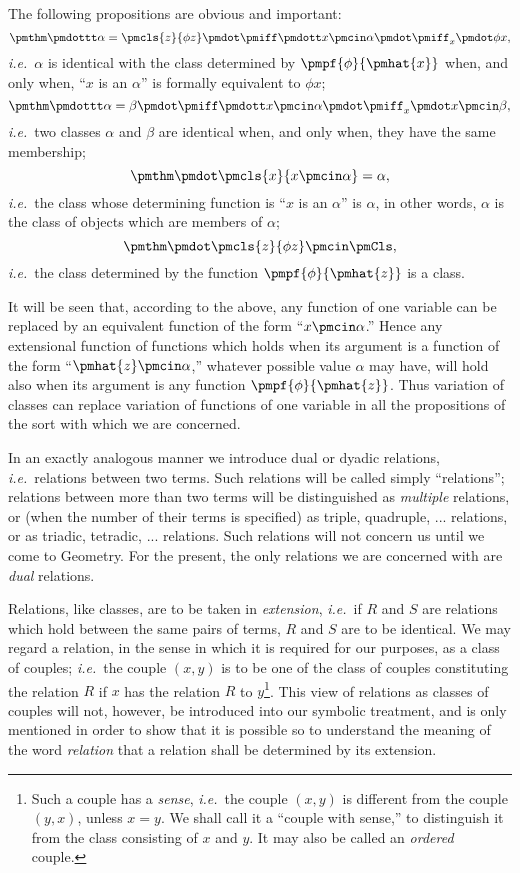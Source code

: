 \documentclass[letterpaper,12pt,openany,leqno]{book}
\newcommand{\pagefirst}[1]{\marginnote[\boxed{\text{#1}}]{\boxed{\text{#1}}}}
\begin{document}
The following propositions are obvious and important:
\[
	\pmthm\pmdottt \alpha = \pmcls{z}{\phi z} \pmdot \pmiff \pmdott x \pmcin \alpha \pmdot \pmiff_x \pmdot \phi x,
\]
\textit{i.e.}\ $\alpha$ is identical with the class determined by $\pmpf{\phi}{\pmhat{x}}$ when, and only when, ``$x$ is an $\alpha$'' is formally equivalent to $\phi x$;
\[
	\pmthm\pmdottt \alpha = \beta \pmdot \pmiff \pmdott x \pmcin \alpha \pmdot \pmiff_x \pmdot x \pmcin \beta,
\]
\textit{i.e.}\ two classes $\alpha$ and $\beta$ are identical when, and only when, they have the same membership;
\[
	\pmthm\pmdot \pmcls{x}{x \pmcin \alpha}=\alpha,
\]
\textit{i.e.}\ the class whose determining function is ``$x$ is an $\alpha$'' is $\alpha$, in other words, $\alpha$ is the class of objects which are members of $\alpha$;
\[
	\pmthm\pmdot \pmcls{z}{\phi z}\pmcin\pmCls,
\]
\textit{i.e.}\ the class determined by the function $\pmpf{\phi}{\pmhat{z}}$ is a class.

It will be seen that, according to the above, any function of one variable can be replaced by an equivalent function of the form ``$x \pmcin \alpha$.'' Hence any extensional function of functions which holds when its argument is a function of the form ``$\pmhat{z}\pmcin\alpha$,'' whatever possible value $\alpha$ may have, will hold also when its argument is any function $\pmpf{\phi}{\pmhat{z}}$. Thus variation of classes can replace variation of functions of one variable in all the propositions of the sort with which we are concerned.
	
In an exactly analogous manner we introduce dual or dyadic relations, \textit{i.e.}\ relations between two terms. Such relations will be called simply ``relations''; relations between more than two terms will be distinguished \pagefirst{27} as \textit{multiple} relations, or (when the number of their terms is specified) as triple, quadruple, ... relations, or as triadic, tetradic, ... relations. Such relations will not concern us until we come to Geometry. For the present, the only relations we are concerned with are \textit{dual} relations.

Relations, like classes, are to be taken in \textit{extension}, \textit{i.e.}\ if $R$ and $S$ are relations which hold between the same pairs of terms, $R$ and $S$ are to be identical. We may regard a relation, in the sense in which it is required for our purposes, as a class of couples; \textit{i.e.}\ the couple $(x, y)$ is to be one of the class of couples constituting the relation $R$ if $x$ has the relation $R$ to $y$\footnote{Such a couple has a \textit{sense}, \textit{i.e.}\ the couple $(x, y)$ is different from the couple $(y, x)$, unless $x=y$. We shall call it a ``couple with sense,'' to distinguish it from the class consisting of $x$ and $y$. It may also be called an \textit{ordered} couple.}. This view of relations as classes of couples will not, however, be introduced into our symbolic treatment, and is only mentioned in order to show that it is possible so to understand the meaning of the word \textit{relation} that a relation shall be determined by its extension.
\end{document}
